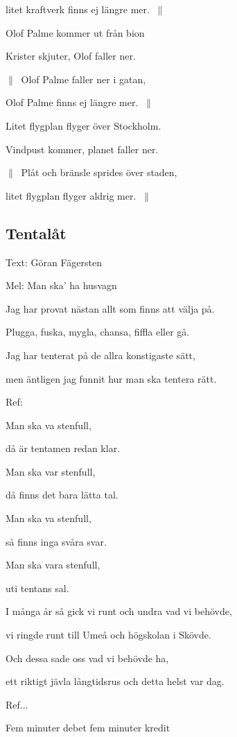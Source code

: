 litet kraftverk finns ej längre mer. $\:\|$\bigskip

Olof Palme kommer ut från bion

Krister skjuter, Olof faller ner.

$\|\:$ Olof Palme faller ner i gatan,

Olof Palme finns ej längre mer. $\:\|$\bigskip

Litet flygplan flyger över Stockholm.

Vindpust kommer, planet faller ner.

$\|\:$ Plåt och bränsle sprides över staden,

litet flygplan flyger aldrig mer. $\:\|$\bigskip

\subsection{\textbf{Tentalåt}}

Text: Göran Fägersten

Mel: Man ska’ ha husvagn\bigskip



Jag har provat nästan allt som finns att välja på.


Plugga, fuska, mygla, chansa, fiffla eller gå.


Jag har tenterat på de allra konstigaste sätt,


men äntligen jag funnit hur man ska tentera rätt.\bigskip


Ref:\bigskip


Man ska va stenfull,


då är tentamen redan klar.


Man ska var stenfull,


då finns det bara lätta tal.


Man ska va stenfull,


så finns inga svåra svar.


Man ska vara stenfull,


uti tentans sal.\bigskip


I många år så gick vi runt och undra vad vi behövde,


vi ringde runt till Umeå och högskolan i Skövde.


Och dessa sade oss vad vi behövde ha,


ett riktigt jävla långtidsrus och detta helst var dag.\bigskip


Ref...\bigskip


Fem minuter debet fem minuter kredit


